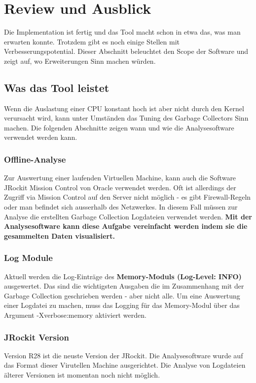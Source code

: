 \chapter{Review und Ausblick}\label{review}
Die Implementation ist fertig und das Tool macht schon in etwa das, was man erwarten konnte. Trotzdem gibt es noch einige Stellen mit Verbesserungspotential. Dieser Abschnitt beleuchtet den Scope der Software und zeigt auf, wo Erweiterungen Sinn machen würden.

\section{Was das Tool leistet}
Wenn die Auslastung einer CPU konstant hoch ist aber nicht durch den Kernel verursacht wird, kann unter Umständen das Tuning des Garbage Collectors Sinn machen. Die folgenden Abschnitte zeigen wann und wie die Analysesoftware verwendet werden kann.

\subsection{Offline-Analyse}
Zur Auswertung einer laufenden Virtuellen Machine, kann auch die Software JRockit Mission Control von Oracle verwendet werden. Oft ist allerdings der Zugriff via Mission Control auf den Server nicht möglich - es gibt Firewall-Regeln oder man befindet sich ausserhalb des Netzwerkes. In diesem Fall müssen zur Analyse die erstellten Garbage Collection Logdateien verwendet werden. \textbf{Mit der Analysesoftware kann diese Aufgabe vereinfacht werden indem sie die gesammelten Daten visualisiert.}

\subsection{Log Module}
Aktuell werden die Log-Einträge des \textbf{Memory-Moduls  (Log-Level: INFO)} ausgewertet. Das sind die wichtigsten Ausgaben die im Zusammenhang mit der Garbage Collection geschrieben werden - aber nicht alle. Um eine Auswertung einer Logdatei zu machen, muss das Logging für das Memory-Modul über das Argument -Xverbose:memory aktiviert werden.

\subsection{JRockit Version}
Version R28 ist die neuste Version der JRockit. Die Analysesoftware wurde auf das Format dieser Virutellen Machine ausgerichtet. Die Analyse von Logdateien älterer Versionen ist momentan noch nicht möglich.

